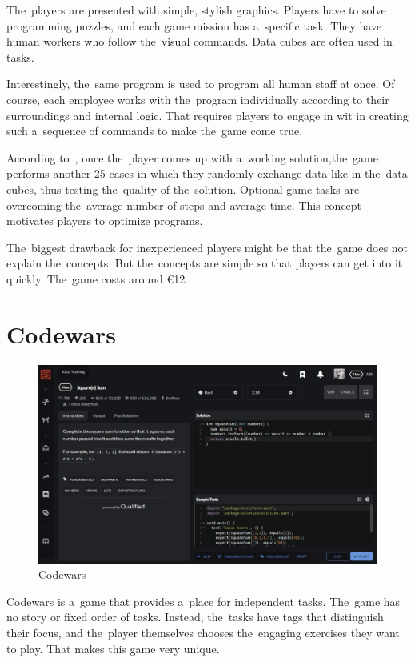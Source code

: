 The~players are presented with simple, stylish graphics.
Players have to solve programming puzzles, and each game mission has a~specific task.
They have human workers who follow the~visual commands.
Data cubes are often used in tasks.

Interestingly, the~same program is used to program all human staff at once.
Of course, each employee works with the~program individually according to their surroundings and internal logic.
That requires players to engage in wit in creating such a~sequence of commands to make the~game come true.

According to~\cite{a2022_tomorrow}, once the~player comes up with a~working solution,\linebreak{}the~game performs another 25 cases in which they randomly exchange data like in the~data cubes, thus testing the~quality of the~solution.
Optional game tasks are overcoming the~average number of steps and average time.
This concept motivates players to optimize programs.

The~biggest drawback for inexperienced players might be that the~game does not explain the~concepts.
But the~concepts are simple so that players can get into it quickly.
The~game costs around €12.

\section{Codewars}

\begin{figure}
    \centering
    \includegraphics[width=1\linewidth]{assets/similar-games/codewars.jpeg}
    \caption{Codewars~\cite{a2022_codewars}}
    \label{fig:codewars}
\end{figure}

Codewars is a~game that provides a~place for independent tasks.
The~game has no story or fixed order of tasks.
Instead, the~tasks have tags that distinguish their focus, and the~player themselves chooses the~engaging exercises they want to play.
That makes this game very unique.

